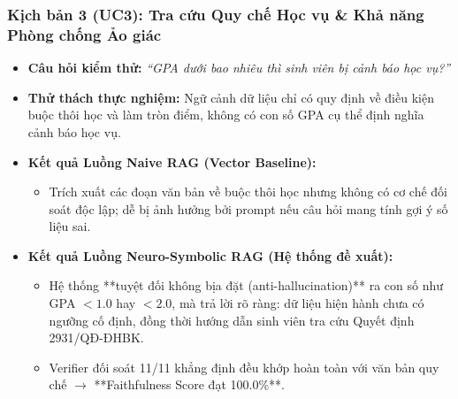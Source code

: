 \documentclass[a4paper,12pt]{article}
\begin{document}
\subsubsection{Kịch bản 3 (UC3): Tra cứu Quy chế Học vụ \& Khả năng Phòng chống Ảo giác}
\begin{itemize}[noitemsep]
    \item \textbf{Câu hỏi kiểm thử:} \textit{``GPA dưới bao nhiêu thì sinh viên bị cảnh báo học vụ?''}
    \item \textbf{Thử thách thực nghiệm:} Ngữ cảnh dữ liệu chỉ có quy định về điều kiện buộc thôi học và làm tròn điểm, không có con số GPA cụ thể định nghĩa cảnh báo học vụ.
    \item \textbf{Kết quả Luồng Naive RAG (Vector Baseline):}
    \begin{itemize}[noitemsep]
        \item Trích xuất các đoạn văn bản về buộc thôi học nhưng không có cơ chế đối soát độc lập; dễ bị ảnh hưởng bởi prompt nếu câu hỏi mang tính gợi ý số liệu sai.
    \end{itemize}
    \item \textbf{Kết quả Luồng Neuro-Symbolic RAG (Hệ thống đề xuất):}
    \begin{itemize}[noitemsep]
        \item Hệ thống **tuyệt đối không bịa đặt (anti-hallucination)** ra con số như GPA $< 1.0$ hay $< 2.0$, mà trả lời rõ ràng: dữ liệu hiện hành chưa có ngưỡng cố định, đồng thời hướng dẫn sinh viên tra cứu Quyết định 2931/QĐ-ĐHBK.
        \item Verifier đối soát 11/11 khẳng định đều khớp hoàn toàn với văn bản quy chế $\rightarrow$ **Faithfulness Score đạt 100.0\%**.
    \end{itemize}
\end{itemize}
\end{document}
